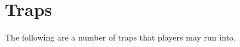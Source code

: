 \chapter{Traps}

\begin{multicols}{2}

The following are a number of traps that players may run into.

\end{multicols}
